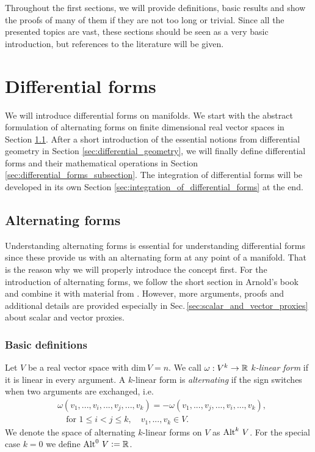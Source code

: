 \documentclass[../master_thesis.tex]{subfiles}
\begin{document}
Throughout the first sections, we will provide 
definitions, basic results and show the proofs of many of them if they are not too 
long or trivial. Since all the presented topics are vast, these sections should be 
seen as a very basic introduction, but references to the literature will be given.

\section{Differential forms}\label{sec:differential_forms}

We will introduce differential forms on manifolds. We start with the abstract 
formulation of alternating forms on finite dimensional real vector spaces 
in Section \ref{sec:alternating_maps}. After a short introduction of 
the essential notions from differential geometry in Section \ref{sec:differential_geometry},
we will finally define differential forms and their mathematical operations
in Section \ref{sec:differential_forms_subsection}. The integration 
of differential forms will be developed in its own Section \ref{sec:integration_of_differential_forms} 
at the end.

\subsection{Alternating forms} \label{sec:alternating_maps}

Understanding alternating forms is essential for understanding differential forms 
since these provide us with an alternating form at any point of a manifold. 
That is the reason why we will properly introduce the concept first.
For the introduction of alternating forms, we follow
the short section in Arnold's book
\cite[Sec. 6.1.]{arnold} and combine it 
with material from \cite[Sec.\,V.1]{topology_and_geometry}.
However, more arguments, proofs and additional details are provided especially  
in Sec.\,\ref{sec:scalar_and_vector_proxies} about scalar and vector proxies.

\subsubsection{Basic definitions}

\begin{definition}
    Let $V$ be a real vector space with $\text{dim}\,V = n$.
    We call $\omega: V^k \rightarrow \mathbb{R}$ 
    \textit{$k$-linear form} if it is linear in every argument.
    A $k$-linear form is 
    \textit{alternating} if the sign switches when two arguments are exchanged, 
    i.e.
    \begin{align*}
        &\omega(v_1,...,v_i,...,v_j,...,v_k)
        = - \omega(v_1,...,v_j,...,v_i,...,v_k), 
        \\& \quad \text{for } 1\leq i < j \leq k,
        \quad v_1,...,v_k \in V.
    \end{align*}
    We denote the space of alternating $k$-linear forms on $V$ as ${\operatorname{Alt}^{k}\,V}$.
    For the special case $k=0$ we define ${\operatorname{Alt}^{0}\,V} \vcentcolon= \mathbb{R}$.
\end{definition}
\end{document}
